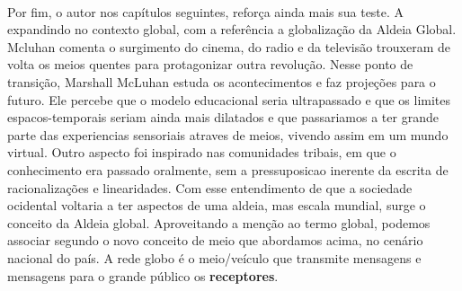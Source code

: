 \documentclass[12pt,a4paper]{article}
\begin{document}
\paragraph{}
Por fim, o autor nos capítulos seguintes,  reforça ainda mais sua teste. A expandindo no contexto global, com a referência a globalização da Aldeia Global.
Mcluhan comenta o surgimento do cinema, do radio e da televisão trouxeram de volta os meios quentes para protagonizar outra revolução. Nesse ponto de transição, Marshall McLuhan\cite{wiki:marshall_mcluhan} estuda os acontecimentos e faz projeções para o futuro. 
Ele percebe que o modelo educacional seria ultrapassado e que os limites espacos-temporais seriam ainda mais dilatados e que passariamos a ter grande parte das experiencias sensoriais atraves
de meios, vivendo assim em um mundo virtual. Outro aspecto foi inspirado nas comunidades tribais, em que o conhecimento era passado oralmente, sem a pressuposicao inerente da escrita de racionalizações e linearidades. Com esse entendimento de que a sociedade ocidental voltaria a ter aspectos de uma aldeia, mas escala mundial, surge o conceito da Aldeia global.
Aproveitando a menção ao termo global, podemos associar segundo o novo conceito de meio que abordamos acima, no cenário nacional do país. A rede globo é o meio/veículo que transmite mensagens e mensagens para o grande público os \textbf{receptores}.
 


 
\end{document}
